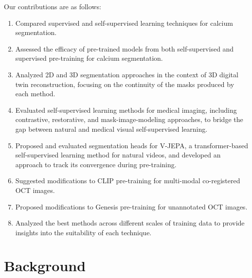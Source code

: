 \documentclass[a4paper,11pt,oneside]{report}
\begin{document}
Our contributions are as follows:
\begin{enumerate}
    \item Compared supervised and self-supervised learning techniques for calcium segmentation.
    \item Assessed the efficacy of pre-trained models from both self-supervised and supervised pre-training for calcium segmentation. 
    \item Analyzed 2D and 3D segmentation approaches in the context of 3D digital twin reconstruction, focusing on the continuity of the masks produced by each method.
    \item Evaluated self-supervised learning methods for medical imaging, including contrastive, restorative, and mask-image-modeling approaches, to bridge the gap between natural and medical visual self-supervised learning.
    \item Proposed and evaluated segmentation heads for V-JEPA, a transformer-based self-supervised learning method for natural videos, and developed an approach to track its convergence during pre-training.
    \item Suggested modifications to CLIP pre-training for multi-modal co-registered OCT images.
    \item Proposed modifications to Genesis pre-training for unannotated OCT images. 
    \item Analyzed the best methods across different scales of training data to provide insights into the suitability of each technique.
\end{enumerate}

\chapter{Background}

\end{document}
